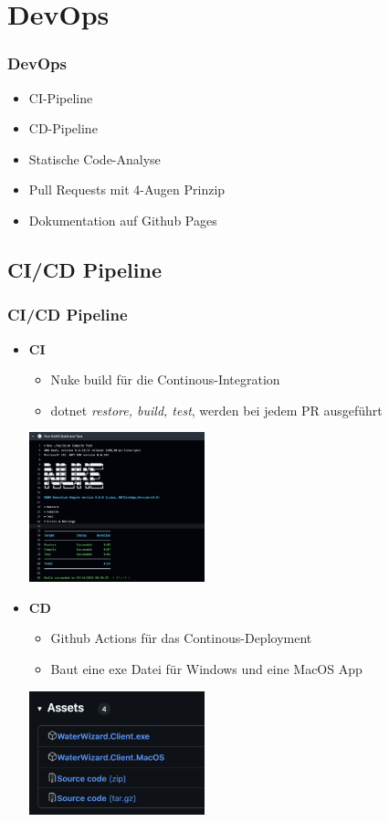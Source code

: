 \documentclass{beamer}
\begin{document}
\section{DevOps}
\begin{frame}
\frametitle{DevOps}
  \begin{itemize}
    \item CI-Pipeline
    \item CD-Pipeline
    \item Statische Code-Analyse
    \item Pull Requests mit 4-Augen Prinzip
    \item Dokumentation auf Github Pages
  \end{itemize}
\end{frame}

\subsection{CI/CD Pipeline}
\begin{frame}
\frametitle{CI/CD Pipeline}
  \begin{multicols}{2}
    \begin{itemize}
      \item \textbf{CI}
        \begin{itemize}
          \item Nuke build für die Continous-Integration
          \item dotnet \textit{restore, build, test}, werden bei jedem PR ausgeführt
        \end{itemize}
      \includegraphics[width=0.4\textwidth]{Nuke-Pipeline.png}
    \end{itemize}
  \columnbreak
    \begin{itemize}
      \item \textbf{CD}
        \begin{itemize}
          \item Github Actions für das Continous-Deployment
          \item Baut eine exe Datei für Windows und eine MacOS App 
        \end{itemize}
        \includegraphics[width=0.4\textwidth]{CD-in-GH.png}
    \end{itemize}
  \end{multicols}
\end{frame}
\end{document}
